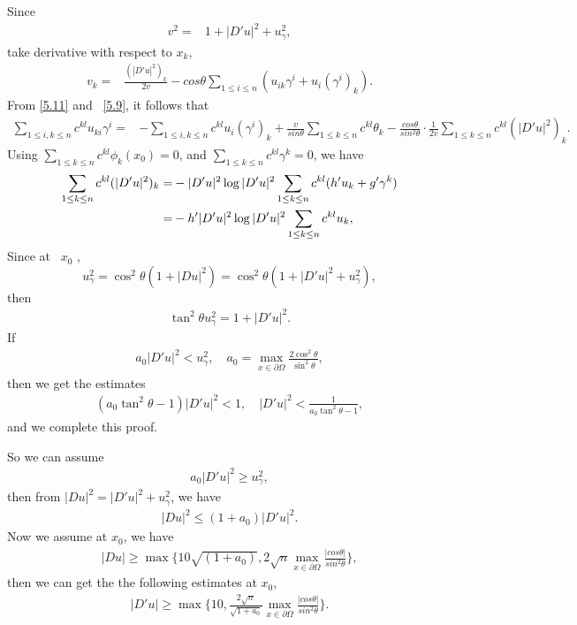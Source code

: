 \documentclass[11pt]{amsart}
\numberwithin{equation}{section}
\begin{document}
Since
\begin{align}\label{5.10}
v^2=&1+|D'u|^2+u^2_\gamma,
\end{align}
take derivative with respect to $x_k$,
\begin{align}\label{5.11}
v_k=&\frac{(|D'u|^2)_k}{2v}-cos\theta\sum_{1\leq i\leq n}(u_{ik}\gamma^i+u_i(\gamma^i)_k).
\end{align}
From \eqref{5.11} and ~\eqref{5.9},  it follows that
\begin{align}\label{5.12}
\sum_{1\leq i,k\leq n}c^{kl}u_{ki}\gamma^i=&-\sum_{1\leq i,k\leq n}c^{kl}u_i(\gamma^i)_k
+\frac{v}{sin\theta}\sum_{1\leq k\leq n}c^{kl}\theta_k-\frac{cos\theta }{sin^2\theta}\cdot\frac{1}{2v}\sum_{1\leq k\leq n}c^{kl}(|D'u|^2)_k.
\end{align}
Using $\sum_{1\leq k\leq n}c^{kl}\phi_k(x_0)=0$, and  $\sum_{1\leq k\leq n}c^{kl}\gamma^k=0$, we have
\begin{align}\label{5.13}
\sum_{1\leq k\leq n}c^{kl}(|D'u|^2)_k=&-|D'u|^2\log|D'u|^2\sum_{1\leq k\leq n}c^{kl}(h'u_k+g'\gamma^k)\notag\\
=&-h'|D'u|^2\log|D'u|^2\sum_{1\leq k\leq n}c^{kl}u_k ,
\end{align}
Since at ~$x_0$ , $$u_\gamma^2=\cos^2\theta(1+|Du|^2)=\cos^2\theta(1+|D'u|^2+u_\gamma^2), $$
then ~
\begin{align}\label{5.13a}
\tan^2\theta u_\gamma^2=1+|D'u|^2.
\end{align}
If ~
\begin{align}\label{5.13b}
a_0|D'u|^2<u_\gamma^2, \quad a_0=\max_{x\in\partial\Omega}\frac{2\cos^2\theta}{\sin^2\theta},\end{align}
then we get the estimates
\begin{align}\label{5.13c}
(a_0\tan^2\theta-1) |D'u|^2<1,
\quad |D'u|^2<\frac{1}{a_0\tan^2\theta-1},
\end{align}
 and we complete this proof.

So we can assume
\begin{align}\label{5.13d}
a_0|D'u|^2\geq u_\gamma^2,
\end{align}
 then from  $|Du|^2=|D'u|^2+u_\gamma^2$, we have
 \begin{align}\label{5.13e}|Du|^2\leq (1+a_0)|D'u|^2.\end{align}
Now we assume at $x_0$,  we have
\begin{align}\label{5.13f}
|Du|\geq \max\{10\sqrt{(1+a_0)}, 2\sqrt{n}\max_{x\in\partial\Omega}{\frac{|cos\theta|}{sin^2\theta}}\},
 \end{align}
 then we can get the the following estimates at $x_0$,
 \begin{align}\label{5.13g} |D'u|\geq \max\{10, \frac{2\sqrt{n}}{\sqrt{1+a_0}}\max_{x\in\partial\Omega}{\frac{|cos\theta|}{sin^2\theta}}\}.\end{align}
\end{document}
